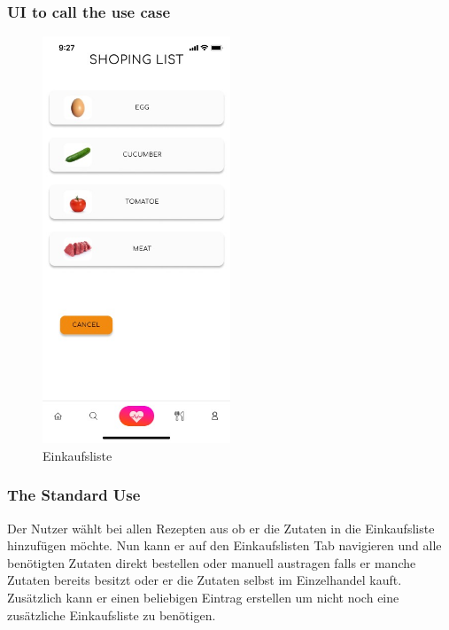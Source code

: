 \documentclass[12pt]{article}
\theoremstyle{definition}
\newenvironment{explanation}{%
   \setlength{\parindent}{0pt}
   \itshape
   \color{blue}
}{}
\begin{document}
\subsubsection{UI to call the use case}
\begin{explanation}
\begin{figure}[h!]
    \begin{center}
        \includegraphics[width=0.5\textwidth]{res/images/ShoppingList.jpeg}
        \caption{Einkaufsliste}
    \end{center}
\end{figure}\end{explanation}

\subsubsection{The Standard Use}
Der Nutzer wählt bei allen Rezepten aus ob er die Zutaten in die Einkaufsliste hinzufügen möchte. Nun kann er auf den Einkaufslisten Tab navigieren und alle benötigten Zutaten direkt bestellen oder manuell austragen falls er manche Zutaten bereits besitzt oder er die Zutaten selbst im Einzelhandel kauft. Zusätzlich kann er einen beliebigen Eintrag erstellen um nicht noch eine zusätzliche Einkaufsliste zu benötigen.
\end{document}
